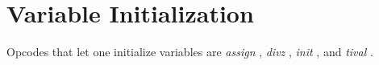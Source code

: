 \begin{comment}
\documentclass[10pt]{article}
\usepackage{fullpage, graphicx, url}
\setlength{\parskip}{1ex}
\setlength{\parindent}{0ex}
\title{Variable Initialization}



\begin{tabular}{ccc}
The Alternative Csound Reference Manual & & \\
Previous &Syntax of the Orchestra &Next

\end{tabular}

\end{comment}
\section{Variable Initialization}


  Opcodes that let one initialize variables are \emph{assign}
, \emph{divz}
, \emph{init}
, and \emph{tival}
. 


\begin{comment}
\begin{tabular}{lcr}
Previous &Home &Next \\
Instrument Block Statements &Up &Instrument Control

\end{tabular}



\end{comment}
